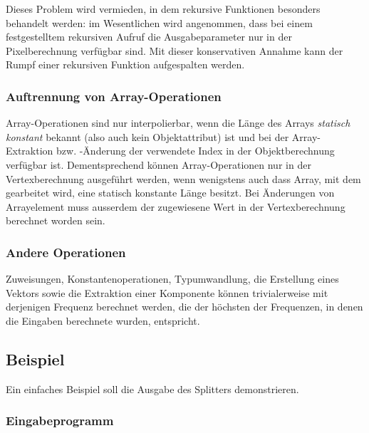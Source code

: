 \documentclass[twoside,a4paper,fleqn,12pt]{book}
\begin{document}
Dieses Problem wird vermieden, in dem rekursive Funktionen besonders behandelt werden: im Wesentlichen wird angenommen,
dass bei einem festgestelltem rekursiven Aufruf die Ausgabeparameter nur in der Pixelberechnung verfügbar sind.
Mit dieser konservativen Annahme kann der Rumpf einer rekursiven Funktion aufgespalten werden.



% 

\subsubsection{Auftrennung von Array-Operationen}

Array-Operationen sind nur interpolierbar, wenn die Länge des Arrays \emph{statisch konstant}
bekannt (also auch kein Objektattribut) ist und bei der Array-Extraktion bzw. \mbox{-Än}\-de\-rung der verwendete Index 
in der Objektberechnung verfügbar ist. Dementsprechend können Array-Operationen nur in der Vertexberechnung ausgeführt werden,
wenn wenigstens auch dass Array, mit dem gearbeitet wird, eine statisch konstante Länge besitzt.
Bei Änderungen von Arrayelement muss ausserdem der zugewiesene Wert in der Vertexberechnung berechnet worden sein.

\subsubsection{Andere Operationen}

Zuweisungen, Konstantenoperationen, Typumwandlung, die Erstellung eines Vektors sowie
die Extraktion einer Komponente können trivialerweise mit derjenigen Frequenz berechnet werden, die der höchsten
der Frequenzen,  in denen die Eingaben berechnete wurden, entspricht.

\subsection{Beispiel}

Ein einfaches Beispiel soll die Ausgabe des Splitters demonstrieren.

\subsubsection{Eingabeprogramm}
\end{document}
